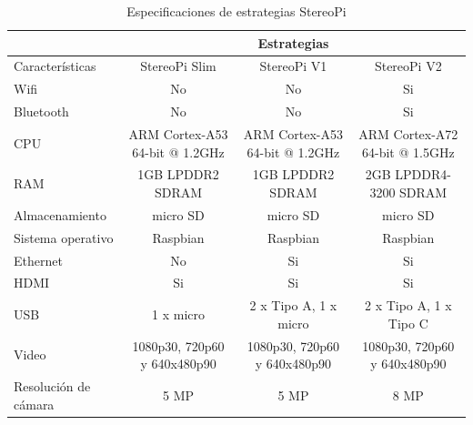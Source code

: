\begin{table}[H]
\centering
\caption{Especificaciones de estrategias StereoPi}
\label{comparacion_stereopi}
\begin{tabular}{l|ccc|}
\cline{2-4}
 & \multicolumn{3}{c|}{Estrategias} \\ \hline
\multicolumn{1}{|l|}{Características} & \multicolumn{1}{c|}{StereoPi Slim} & \multicolumn{1}{c|}{StereoPi V1} & StereoPi V2 \\ \hline
\multicolumn{1}{|l|}{Wifi} & \multicolumn{1}{c|}{No} & \multicolumn{1}{c|}{No} & Si \\ \hline
\multicolumn{1}{|l|}{Bluetooth} & \multicolumn{1}{c|}{No} & \multicolumn{1}{c|}{No} & Si \\ \hline
\multicolumn{1}{|p{2.5cm}|}{CPU} & \multicolumn{1}{p{2.5cm}|}{ARM Cortex-A53 64-bit @ 1.2GHz} & \multicolumn{1}{p{2.5cm}|}{ARM Cortex-A53 64-bit @ 1.2GHz} &\multicolumn{1}{p{2.5cm}|}{ARM Cortex-A72 64-bit @ 1.5GHz} \\ \hline
\multicolumn{1}{|p{2.5cm}|}{RAM} & \multicolumn{1}{p{2.5cm}|}{1GB LPDDR2 SDRAM} & \multicolumn{1}{p{2.5cm}|}{1GB LPDDR2 SDRAM} & \multicolumn{1}{p{2.5cm}|}{2GB LPDDR4-3200 SDRAM} \\ \hline
\multicolumn{1}{|p{3cm}|}{Almacenamiento} & \multicolumn{1}{p{2.5cm}|}{micro SD} & \multicolumn{1}{p{2.5cm}|}{micro SD} & \multicolumn{1}{p{2.5cm}|}{micro SD } \\ \hline
\multicolumn{1}{|p{2.5cm}|}{Sistema operativo} & \multicolumn{1}{p{2.5cm}|}{Raspbian} & \multicolumn{1}{p{2.5cm}|}{Raspbian} & \multicolumn{1}{p{2.5cm}|}{Raspbian} \\ \hline
\multicolumn{1}{|p{2.5cm}|}{Ethernet} & \multicolumn{1}{c|}{No} & \multicolumn{1}{c|}{Si} & Si \\ \hline
\multicolumn{1}{|p{2.5cm}|}{HDMI} & \multicolumn{1}{c|}{Si} & \multicolumn{1}{c|}{Si} & Si \\ \hline
\multicolumn{1}{|p{2.5cm}|}{USB} & \multicolumn{1}{c|}{1 x micro} & \multicolumn{1}{c|}{2 x Tipo A, 1 x micro} & 2 x Tipo A, 1 x Tipo C \\ \hline
\multicolumn{1}{|p{2.5cm}|}{Video} & \multicolumn{1}{p{2.5cm}|}{1080p30, 720p60 y 640x480p90} & \multicolumn{1}{p{2.5cm}|}{1080p30, 720p60 y 640x480p90} & \multicolumn{1}{p{2.5cm}|}{1080p30, 720p60 y 640x480p90} \\ \hline
\multicolumn{1}{|p{2.5cm}|}{Resolución de cámara} & \multicolumn{1}{c|}{5 MP} & \multicolumn{1}{p{2.5cm}|}{5 MP} & 8 MP \\ \hline
\end{tabular}
\end{table}
